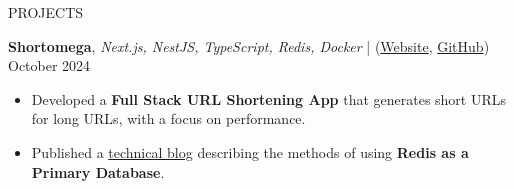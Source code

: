 \documentclass{resume} %
\begin{document}
\begin{rSection}{PROJECTS}
 \item \textbf{Shortomega}, \textit{Next.js, NestJS, TypeScript, Redis, Docker} | (\href{https://shortomega.vercel.app/} {Website}, \href{https://github.com/ninadnaik10/shortomega} {GitHub})  \hfill {October 2024}
    \begin{itemize}
        \setlength\itemsep{-0.6em}
        \item  Developed a \textbf{ Full Stack URL Shortening App} that generates short URLs for long URLs, with a focus on performance.
        \item  Published a \href{https://ninadtech.hashnode.dev/using-redis-as-a-primary-database}{technical blog} describing the methods of using \textbf{Redis as a Primary Database}.


\end{itemize}
\end{rSection}
\end{document}
